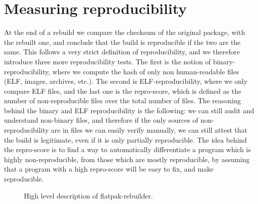 \documentclass[a4paper,11pt,oneside]{report}
\theoremstyle{definition}
\newcommand{\sysname}{flatpak-rebuilder\xspace}
\begin{document}
\section{Measuring reproducibility}
At the end of a rebuild we compare the checksum of the original package, with
the rebuilt one, and conclude that the build is reproducible if the two are the
same. This follows a very strict definition of reproducibility, and we
therefore introduce three more reproducibility tests. The first is the notion
of binary-reproducibility, where we compute the hash of only non human-readable
files (ELF, images, archives, etc.). The second is ELF-reproducibility, where we
only compare ELF files, and the last one is the repro-score, which is defined
as the number of non-reproducible files over the total number of files. The
reasoning behind the binary and ELF reproducibility is the following: we can
still audit and understand non-binary files, and therefore if the only sources
of non-reproducibility are in files we can easily verify manually, we can still
attest that the build is legitimate, even if it is only partially reproducible.
The idea behind the repro-score is to find a way to automatically differentiate
a program which is highly non-reproducible, from those which are mostly
reproducible, by assuming that a program with a high repro-score will be easy
to fix, and make reproducible.

\begin{figure}[h]
    \caption{High level description of \sysname.}
    \label{fig:flatpakrebuilder}
\end{figure}
\end{document}
